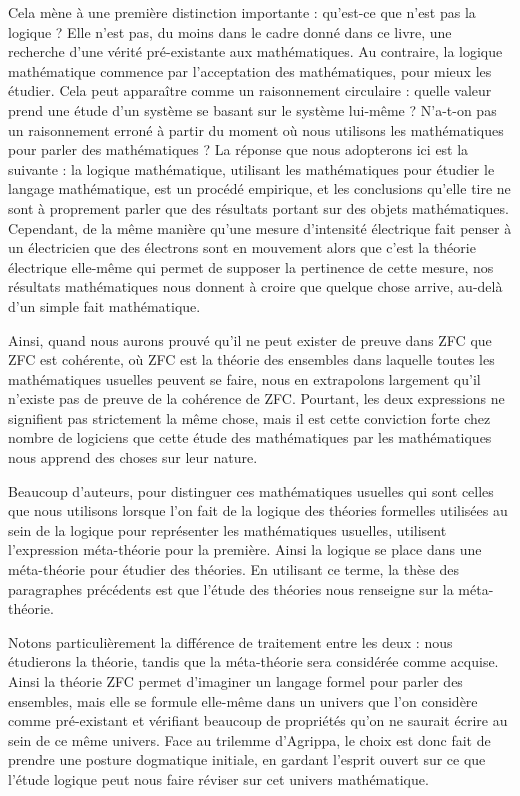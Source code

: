 Cela mène à une première distinction importante : qu'est-ce que n'est pas la
logique ? Elle n'est pas, du moins dans le cadre donné dans ce livre, une
recherche d'une vérité pré-existante aux mathématiques. Au contraire, la logique
mathématique commence par l'acceptation des mathématiques, pour mieux les
étudier. Cela peut apparaître comme un raisonnement circulaire : quelle valeur
prend une étude d'un système se basant sur le système lui-même ? N'a-t-on pas un
raisonnement erroné à partir du moment où nous utilisons les mathématiques pour
parler des mathématiques ? La réponse que nous adopterons ici est la suivante :
la logique mathématique, utilisant les mathématiques pour étudier le langage
mathématique, est un procédé empirique, et les conclusions qu'elle tire ne sont
à proprement parler que des résultats portant sur des objets mathématiques.
Cependant, de la même manière qu'une mesure d'intensité électrique fait penser à
un électricien que des électrons sont en mouvement alors que c'est la théorie
électrique elle-même qui permet de supposer la pertinence de cette mesure, nos
résultats mathématiques nous donnent à croire que quelque chose arrive, au-delà
d'un simple fait mathématique.

Ainsi, quand nous aurons prouvé qu'il ne peut exister de preuve dans ZFC que ZFC
est cohérente, où ZFC est la théorie des ensembles dans laquelle toutes les
mathématiques usuelles peuvent se faire, nous en extrapolons largement qu'il
n'existe pas de preuve de la cohérence de ZFC. Pourtant, les deux expressions
ne signifient pas strictement la même chose, mais il est cette conviction forte
chez nombre de logiciens que cette étude des mathématiques par les mathématiques
nous apprend des choses sur leur nature.

Beaucoup d'auteurs, pour distinguer ces mathématiques usuelles qui sont celles
que nous utilisons lorsque l'on fait de la logique des théories formelles
utilisées au sein de la logique pour représenter les mathématiques usuelles,
utilisent l'expression \og méta-théorie\fg{} pour la première. Ainsi la logique
se place dans une méta-théorie pour étudier des théories. En utilisant ce terme,
la thèse des paragraphes précédents est que l'étude des théories nous renseigne
sur la méta-théorie.

Notons particulièrement la différence de traitement entre les deux : nous
étudierons la théorie, tandis que la méta-théorie sera considérée comme acquise.
Ainsi la théorie ZFC permet d'imaginer un langage formel pour parler des
ensembles, mais elle se formule elle-même dans un univers que l'on considère
comme pré-existant et vérifiant beaucoup de propriétés qu'on ne saurait écrire
au sein de ce même univers. Face au trilemme d'Agrippa, le choix est donc fait
de prendre une posture dogmatique initiale, en gardant l'esprit ouvert sur ce
que l'étude logique peut nous faire réviser sur cet univers mathématique.

